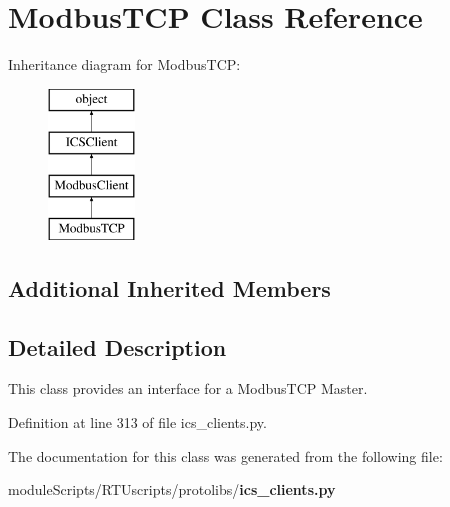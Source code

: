 \section{Modbus\+T\+C\+P Class Reference}
\label{classprotolibs_1_1ics__clients_1_1_modbus_t_c_p}
Inheritance diagram for Modbus\+T\+C\+P\+:\begin{figure}[H]
\begin{center}
\leavevmode
\includegraphics[height=4.000000cm]{classprotolibs_1_1ics__clients_1_1_modbus_t_c_p}
\end{center}
\end{figure}
\subsection*{Additional Inherited Members}


\subsection{Detailed Description}
\begin{DoxyVerb}This class provides an interface for a ModbusTCP Master.\end{DoxyVerb}
 

Definition at line 313 of file ics\+\_\+clients.\+py.



The documentation for this class was generated from the following file\+:\begin{DoxyCompactItemize}
\item 
module\+Scripts/\+R\+T\+Uscripts/protolibs/{\bf ics\+\_\+clients.\+py}\end{DoxyCompactItemize}
